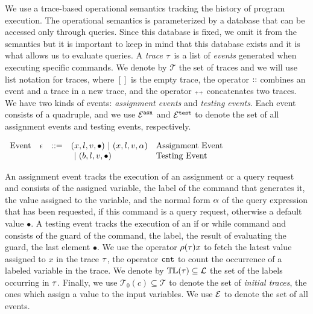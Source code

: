 We use a trace-based operational semantics tracking the history of program execution. The operational semantics is parameterized by a database that can be accessed only through queries. Since this database is fixed, we omit it from the semantics but it is important to keep in mind that this database exists and it is what allows us to evaluate queries.
A \emph{trace}
$\mathtt{\tau}$ is a list of \emph{events} generated when executing specific commands. We denote by $\mathcal{T}$ the set of traces and we will use list notation for traces, where $[]$ is the empty trace, the operator ${\small ::}$ combines an event and a trace in a new trace, 
and the operator ${\scriptscriptstyle ++}$ concatenates two traces. 
We have two kinds of events: \emph{assignment events} and \emph{testing events}. 
Each event consists of a quadruple,
and we use $\mathcal{E}^{\mathtt{{asn}}}$ and $\mathcal{E}^{\mathtt{{test}}}$ to denote the set of all assignment events and testing events, respectively.
\begin{center}
  $ \begin{array}{lllll}
  \mbox{Event} 
  & \mathtt{\epsilon} & ::= & 
  ({x}, l, v, \bullet) ~|~ ({x}, l, v, \alpha)  & \mbox{Assignment Event} \\
  &&& ~|~(b, l, v, \bullet)  & \mbox{Testing Event}
  \\
  \end{array}$
  \end{center}
An assignment event tracks the execution of an assignment  or a query request and consists of the assigned variable, the label of the command that generates it, the value assigned to the variable, and the normal form  $\alpha$ of the query expression that has been requested, if this command is a query request, otherwise a default value $\bullet$.
A testing event tracks the execution of an if or while command and consists of the guard of the command, the label, the result of evaluating the guard, the last element $\bullet$. 
 We use the operator $\rho (\mathtt{\tau}) x$ to fetch the latest value assigned to  $x$ in the trace $\mathtt{\tau}$, the operator
$\mathtt{cnt}$ to count the occurrence of a labeled variable in the trace.
We denote by $\mathbb{TL}(\mathtt{\tau}) \subseteq \mathcal{L}$ the set of the labels occurring in $\mathtt{\tau}$.
Finally, we use $\mathcal{T}_0(c) \subseteq \mathcal{T}$ to denote the set of \emph{initial traces}, the ones
which assign a value to the input variables. We use $\mathcal{E}$ to denote the set of all events.




